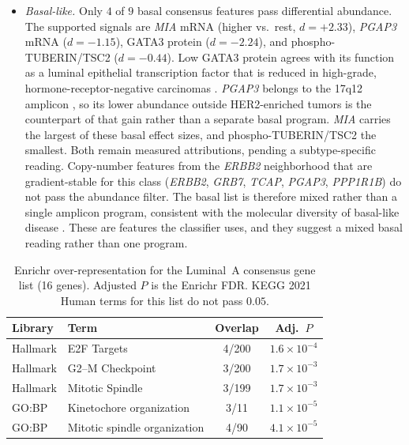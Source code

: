 \documentclass[lettersize,journal]{IEEEtran}
\begin{document}
\begin{itemize}
    \item \textit{Basal-like.}
    Only $4$ of $9$ basal consensus features pass differential abundance.
    The supported signals are \textit{MIA} mRNA (higher vs.\ rest, $d=+2.33$), \textit{PGAP3} mRNA ($d=-1.15$),
    GATA3 protein ($d=-2.24$), and phospho-TUBERIN/TSC2 ($d=-0.44$).
    Low GATA3 protein agrees with its function as a luminal epithelial transcription factor that is reduced in high-grade, hormone-receptor-negative carcinomas \cite{Mehra2005GATA3}.
    \textit{PGAP3} belongs to the 17q12 amplicon \cite{Kao2006Amplicon,Staaf2010HER2}, so its lower abundance outside HER2-enriched tumors is the counterpart of that gain rather than a separate basal program.
    \textit{MIA} carries the largest of these basal effect sizes, and phospho-TUBERIN/TSC2 the smallest.
    Both remain measured attributions, pending a subtype-specific reading.
    Copy-number features from the \textit{ERBB2} neighborhood that are gradient-stable for this class
    (\textit{ERBB2}, \textit{GRB7}, \textit{TCAP}, \textit{PGAP3}, \textit{PPP1R1B}) do not pass the abundance filter.
    The basal list is therefore mixed rather than a single amplicon program, consistent with the molecular diversity of basal-like disease
    \cite{Koboldt2012BRCA}. These are features the classifier uses, and they suggest a mixed basal reading rather than one program.
\end{itemize}

\begin{table}[t]
\centering
\caption{Enrichr over-representation for the Luminal~A consensus gene list (16 genes). Adjusted $P$ is the Enrichr FDR. KEGG 2021 Human terms for this list do not pass $0.05$.}
\label{tab:luma_enrichment}
\begin{tabular}{@{}llcc@{}}
\toprule
\textbf{Library} & \textbf{Term} & \textbf{Overlap} & \textbf{Adj.\ $P$} \\
\midrule
Hallmark & E2F Targets & 4/200 & $1.6\times 10^{-4}$ \\
Hallmark & G2--M Checkpoint & 3/200 & $1.7\times 10^{-3}$ \\
Hallmark & Mitotic Spindle & 3/199 & $1.7\times 10^{-3}$ \\
GO:BP & Kinetochore organization & 3/11 & $1.1\times 10^{-5}$ \\
GO:BP & Mitotic spindle organization & 4/90 & $4.1\times 10^{-5}$ \\
\bottomrule
\end{tabular}
\end{table}
\end{document}
